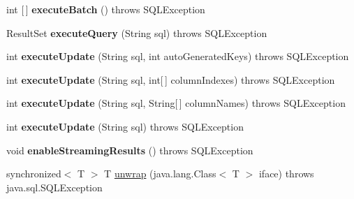 \begin{DoxyCompactItemize}
\mbox{\label{classcom_1_1mysql_1_1cj_1_1jdbc_1_1_statement_wrapper_ad79219376f282ae7f12987454e338366}} 
int \mbox{[}$\,$\mbox{]} {\bfseries execute\+Batch} ()  throws S\+Q\+L\+Exception 
\item 
\mbox{\label{classcom_1_1mysql_1_1cj_1_1jdbc_1_1_statement_wrapper_af554f27181060b4523172617f7101584}} 
Result\+Set {\bfseries execute\+Query} (String sql)  throws S\+Q\+L\+Exception 
\item 
\mbox{\label{classcom_1_1mysql_1_1cj_1_1jdbc_1_1_statement_wrapper_aa1d6ae38bd7f57560c93b45fed82f713}} 
int {\bfseries execute\+Update} (String sql, int auto\+Generated\+Keys)  throws S\+Q\+L\+Exception 
\item 
\mbox{\label{classcom_1_1mysql_1_1cj_1_1jdbc_1_1_statement_wrapper_a7fea6987db9c3689e11c0a25887e9c5c}} 
int {\bfseries execute\+Update} (String sql, int\mbox{[}$\,$\mbox{]} column\+Indexes)  throws S\+Q\+L\+Exception 
\item 
\mbox{\label{classcom_1_1mysql_1_1cj_1_1jdbc_1_1_statement_wrapper_a3a7d7ad287230c2187c2cbef6e0ed583}} 
int {\bfseries execute\+Update} (String sql, String\mbox{[}$\,$\mbox{]} column\+Names)  throws S\+Q\+L\+Exception 
\item 
\mbox{\label{classcom_1_1mysql_1_1cj_1_1jdbc_1_1_statement_wrapper_ae9f4d1e17c24a7d1310dab07615437d3}} 
int {\bfseries execute\+Update} (String sql)  throws S\+Q\+L\+Exception 
\item 
\mbox{\label{classcom_1_1mysql_1_1cj_1_1jdbc_1_1_statement_wrapper_ae7419c70c8518031ba3131cc6e22253d}} 
void {\bfseries enable\+Streaming\+Results} ()  throws S\+Q\+L\+Exception 
\item 
synchronized$<$ T $>$ T \mbox{\hyperlink{classcom_1_1mysql_1_1cj_1_1jdbc_1_1_statement_wrapper_ab5729968dd5a079a6fabb69c3e1dde40}{unwrap}} (java.\+lang.\+Class$<$ T $>$ iface)  throws java.\+sql.\+S\+Q\+L\+Exception 

\end{DoxyCompactItemize}
